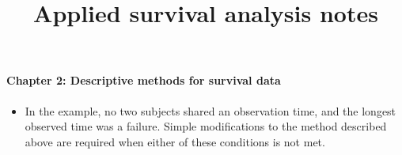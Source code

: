 \documentclass[a4paper,11pt]{article}
\title{Applied survival analysis notes}
\author{}
\date{}
\begin{document}
\maketitle

\paragraph{Chapter 2: Descriptive methods for survival data}
\begin{itemize}
\item In the example, no two subjects shared an observation time, and the longest observed time was a failure. 
Simple modifications to the method described above are required when either of these conditions is not met.
\end{itemize}
\end{document}
